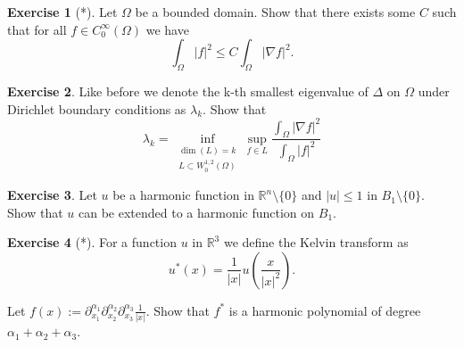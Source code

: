 \documentclass[a4paper,11pt]{article}
\theoremstyle{definition}
\newtheorem{exercise}{Exercise}
\begin{document}
\begin{exercise}[*]
	Let $\Omega$ be a bounded domain. Show that there exists some $C$ such that for all $f \in C^\infty_0(\Omega)$ we have
	\[ \int_\Omega |f|^2 \leq C \int_\Omega |\nabla f|^2. \]
\end{exercise}

\begin{exercise}
	Like before we denote the k-th smallest eigenvalue of $\Delta$ on $\Omega$ under Dirichlet boundary conditions as $\lambda_k$. Show that
	\[\lambda_k = \inf_{\substack{\dim(L) = k \\ L \subset W^{1,2}_0(\Omega)}} \sup_{f \in L} \frac{\int_\Omega |\nabla f|^2}{\int_\Omega |f|^2} \]
\end{exercise}

\begin{exercise}
	Let $u$ be a harmonic function in $\mathbb{R}^n \setminus \{0\}$ and $|u| \leq 1$ in $B_1 \setminus \{ 0 \}$. Show that $u$ can be extended to a harmonic function on $B_1$.
\end{exercise}

\begin{exercise}[*]
	For a function $u$ in $\mathbb{R}^3$ we define the Kelvin transform as
	\[u^*(x) = \frac{1}{|x|} u(\frac{x}{|x|^2}).\]

	Let $f(x) := \partial^{\alpha_1}_{x_1}\partial^{\alpha_2}_{x_2}\partial^{\alpha_3}_{x_3} \frac{1}{|x|}$. Show that $f^*$ is a harmonic polynomial of degree $\alpha_1 + \alpha_2 + \alpha_3$.
\end{exercise}
\end{document}
